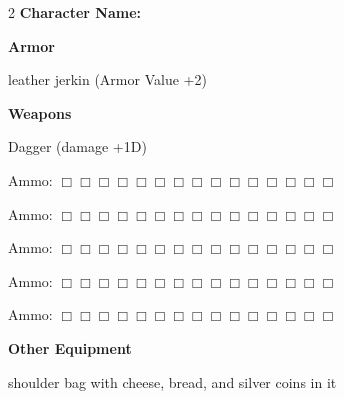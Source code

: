 \documentclass[10pt]{article}
\begin{document}
\begin{multicols}{2}
\textbf{Character Name:} \hrulefill

\vspace{24pt}

\textbf{Armor}


leather jerkin (Armor Value +2)




\hrulefill


\hrulefill


\hrulefill



\vspace{24pt}

\textbf{Weapons}


Dagger (damage +1D)




\hrulefill

Ammo: $\Box \Box \Box \Box \Box \Box \Box \Box \Box \Box \Box \Box \Box \Box \Box$ 


\hrulefill

Ammo: $\Box \Box \Box \Box \Box \Box \Box \Box \Box \Box \Box \Box \Box \Box \Box$ 


\hrulefill

Ammo: $\Box \Box \Box \Box \Box \Box \Box \Box \Box \Box \Box \Box \Box \Box \Box$ 


\hrulefill

Ammo: $\Box \Box \Box \Box \Box \Box \Box \Box \Box \Box \Box \Box \Box \Box \Box$ 


\hrulefill

Ammo: $\Box \Box \Box \Box \Box \Box \Box \Box \Box \Box \Box \Box \Box \Box \Box$ 



\vspace{24pt}

\textbf{Other Equipment}


shoulder bag with cheese, bread, and silver coins in it




\hrulefill


\hrulefill


\hrulefill


\hrulefill


\hrulefill


\hrulefill


\hrulefill


\hrulefill


\hrulefill


\hrulefill



\end{multicols}
\end{document}
